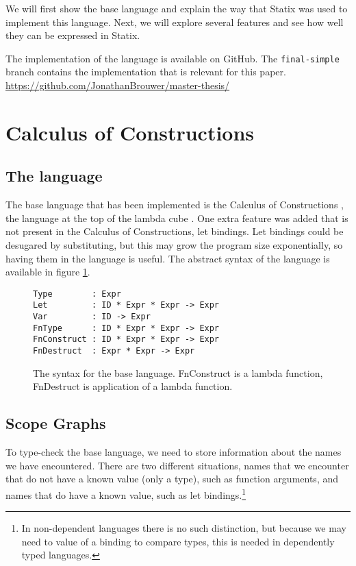 \documentclass[a4paper,UKenglish,cleveref, autoref, thm-restate]{oasics-v2021}
\begin{document}
We will first show the base language and explain the way that Statix was used to implement this language. Next, we will explore several features and see how well they can be expressed in Statix.

The implementation of the language is available on GitHub. The \verb|final-simple| branch contains the implementation that is relevant for this paper. \\
\url{https://github.com/JonathanBrouwer/master-thesis/}

\section{Calculus of Constructions}

\subsection{The language}

The base language that has been implemented is the Calculus of Constructions \cite{Coquand_Huet_1988}, the language at the top of the lambda cube \cite{lambda_cube}. One extra feature was added that is not present in the Calculus of Constructions, let bindings. Let bindings could be desugared by substituting, but this may grow the program size exponentially, so having them in the language is useful. The abstract syntax of the language is available in figure \ref{fig:syntax}.

\begin{figure}[h]
\begin{lstlisting}
Type        : Expr
Let         : ID * Expr * Expr -> Expr
Var         : ID -> Expr
FnType      : ID * Expr * Expr -> Expr
FnConstruct : ID * Expr * Expr -> Expr
FnDestruct  : Expr * Expr -> Expr
\end{lstlisting}
\caption{The syntax for the base language. FnConstruct is a lambda function, FnDestruct is application of a lambda function.}
\label{fig:syntax}
\end{figure}


\subsection{Scope Graphs}

To type-check the base language, we need to store information about the names we have encountered. There are two different situations, names that we encounter that do not have a known value (only a type), such as function arguments, and names that do have a known value, such as let bindings.\footnote{In non-dependent languages there is no such distinction, but because we may need to value of a binding to compare types, this is needed in dependently typed languages.}
\end{document}
